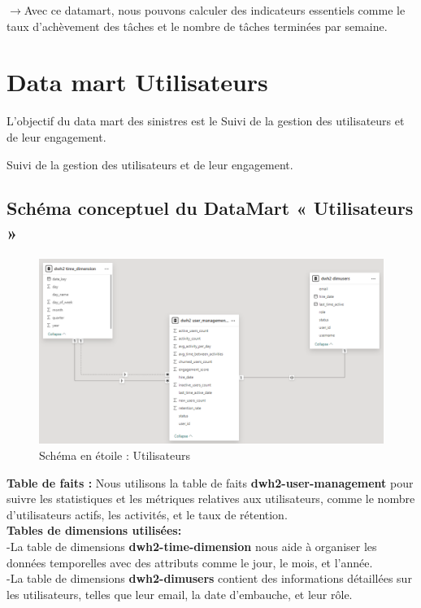 $\rightarrow$Avec ce datamart, nous pouvons calculer des indicateurs essentiels comme le taux d'achèvement des tâches et le nombre de tâches terminées par semaine.








\newpage
\section{Data mart Utilisateurs}
L’objectif du data mart des sinistres est le Suivi de la gestion des utilisateurs et de leur engagement.

Suivi de la gestion des utilisateurs et de leur engagement.
\subsection{ Schéma conceptuel du DataMart « Utilisateurs »}
\begin{figure}[h!]

    \centering
    \includegraphics[width=1\textwidth]{chap6.images/etoile1.png}
    \caption{ Schéma en étoile : Utilisateurs}

\end{figure}
\noindent
\textbf{Table de faits :} Nous utilisons la table de faits \textbf{dwh2-user-management} pour suivre les statistiques et les métriques relatives aux utilisateurs, comme le nombre d'utilisateurs actifs, les activités, et le taux de rétention.\\


\noindent
\textbf{Tables de dimensions utilisées:}\\
-La table de dimensions \textbf{dwh2-time-dimension} nous aide à organiser les données temporelles avec des attributs comme le jour, le mois, et l'année.\\
-La table de dimensions \textbf{dwh2-dimusers} contient des informations détaillées sur les utilisateurs, telles que leur email, la date d'embauche, et leur rôle.\\


